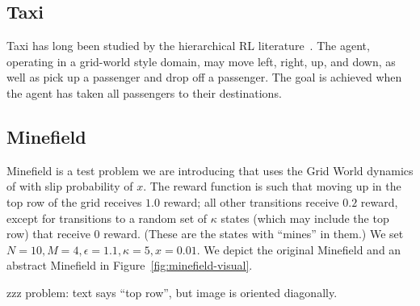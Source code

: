 \subsection{Taxi}

Taxi has long been studied by the hierarchical RL literature~\cite{dietterich2000hierarchical}. The agent, operating in a grid-world style domain, may move left, right, up, and down, as well as pick up a passenger and drop off a passenger. The goal is achieved when the agent has taken all passengers to their destinations.






\subsection{Minefield}

Minefield is a test problem we are introducing that uses the Grid World dynamics of \citeauthor{russell1995modern} with slip probability of $x$. The reward function is such that moving up in the top row of the grid receives $1.0$ reward; all other transitions receive $0.2$ reward, except for transitions to a random set of $\kappa$ states (which may include the top row) that receive $0$ reward. (These are the states with ``mines'' in them.) We set $N=10, M=4, \epsilon=1.1, \kappa = 5, x = 0.01$. We depict the original Minefield and an abstract Minefield in Figure~\ref{fig:minefield-visual}.

zzz problem: text says ``top row'', but image is oriented diagonally.

